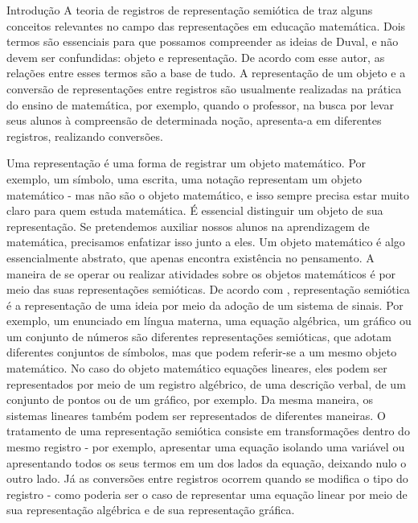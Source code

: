 \begin{apresentacao}{Introdução}
A teoria de registros de representação semiótica de \cite{Durval1995} traz alguns conceitos relevantes no campo das representações em educação matemática. Dois termos são essenciais para que possamos compreender as ideias de Duval, e não devem ser confundidas: objeto e representação. De acordo com esse autor, as relações entre esses termos são a base de tudo. A representação de um objeto e a conversão de representações entre registros são usualmente realizadas na prática do ensino de matemática, por exemplo, quando o professor, na busca por levar seus alunos à compreensão de determinada noção, apresenta-a em diferentes registros, realizando conversões. 

Uma representação é uma forma de registrar um objeto matemático. Por exemplo, um símbolo, uma escrita, uma notação representam um objeto matemático - mas não são o objeto matemático, e isso sempre precisa estar muito claro para quem estuda matemática. É essencial distinguir um objeto de sua representação. Se pretendemos auxiliar nossos alunos na aprendizagem de matemática, precisamos enfatizar isso junto a eles. Um objeto matemático é algo essencialmente abstrato, que apenas encontra existência no pensamento. A maneira de se operar ou realizar atividades sobre os objetos matemáticos é por meio das suas representações semióticas. De acordo com  \cite{Durval1995}, representação semiótica é a representação de uma ideia por meio da adoção de um sistema de sinais. Por exemplo, um enunciado em língua materna, uma equação algébrica, um gráfico ou um conjunto de números são diferentes representações semióticas, que adotam diferentes conjuntos de símbolos, mas que podem referir-se a um mesmo objeto matemático. No caso do objeto matemático equações lineares, eles podem ser representados por meio de um registro algébrico, de uma descrição verbal, de um conjunto de pontos ou de um gráfico, por exemplo. Da mesma maneira, os sistemas lineares também podem ser representados de diferentes maneiras. O tratamento de uma representação semiótica consiste em transformações dentro do mesmo registro - por exemplo, apresentar uma equação isolando uma variável ou apresentando todos os seus termos em um dos lados da equação, deixando nulo o outro lado. Já as conversões entre registros ocorrem quando se modifica o tipo do registro - como poderia ser o caso de representar uma equação linear por meio de sua representação algébrica e de sua representação gráfica.


\end{apresentacao}
